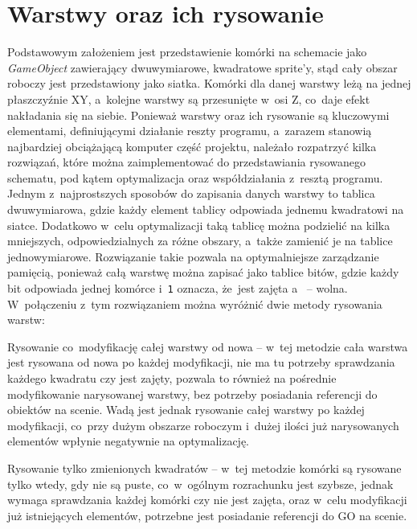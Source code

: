 \section{Warstwy oraz ich rysowanie}
\label{sec:warstwy_oraz_ich_rysowanie}

Podstawowym założeniem jest przedstawienie komórki na schemacie jako \textit{GameObject} zawierający dwuwymiarowe,
kwadratowe sprite'y,
stąd cały obszar roboczy jest przedstawiony jako siatka.
Komórki dla danej warstwy leżą na jednej płaszczyźnie XY, a~kolejne warstwy są przesunięte w~osi Z,
co~daje efekt nakładania się na siebie.
Ponieważ warstwy oraz ich rysowanie są kluczowymi elementami, definiującymi działanie reszty programu,
a~zarazem stanowią najbardziej obciążającą komputer część projektu,
należało rozpatrzyć kilka rozwiązań, które można zaimplementować do przedstawiania rysowanego schematu,
pod kątem optymalizacja oraz współdziałania z~resztą programu.\\

\indent Jednym z~najprostszych sposobów do zapisania danych warstwy to tablica dwuwymiarowa,
gdzie każdy element tablicy odpowiada jednemu kwadratowi na siatce.
Dodatkowo w~celu optymalizacji taką tablicę można podzielić na kilka mniejszych,
odpowiedzialnych za różne obszary, a~także zamienić je na tablice jednowymiarowe.
Rozwiązanie takie pozwala na optymalniejsze zarządzanie pamięcią,
ponieważ całą warstwę można zapisać jako tablice bitów,
gdzie każdy bit odpowiada jednej komórce i~\texttt{1} oznacza,
że~jest zajęta a~ -- wolna.
W~połączeniu z~tym rozwiązaniem można wyróżnić dwie metody rysowania warstw:

\begin{citemize}
    \item Rysowanie co~modyfikację całej warstwy od nowa -- w~tej metodzie cała warstwa jest rysowana od nowa po każdej modyfikacji,
    nie ma tu potrzeby sprawdzania każdego kwadratu czy jest zajęty, pozwala to również na pośrednie modyfikowanie narysowanej warstwy,
    bez potrzeby posiadania referencji do obiektów na scenie.
    Wadą jest jednak rysowanie całej warstwy po każdej modyfikacji,
    co~przy dużym obszarze roboczym i~dużej ilości już narysowanych elementów wpłynie negatywnie na optymalizację.
    \item Rysowanie tylko zmienionych kwadratów -- w~tej metodzie komórki są rysowane tylko wtedy, gdy nie są puste,
    co~w~ogólnym rozrachunku jest szybsze, jednak wymaga sprawdzania każdej komórki czy nie jest zajęta,
    oraz w~celu modyfikacji już istniejących elementów, potrzebne jest posiadanie referencji do GO na scenie.
\end{citemize}

